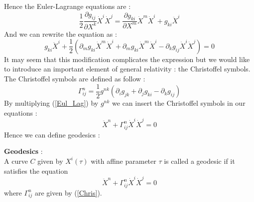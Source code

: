 \documentclass[a4paper,12pt]{article}
\theoremstyle{definition}
\begin{document}
Hence the Euler-Lagrange equations are :
\begin{equation}
	\frac{1}{2}\frac{\partial g_{ij}}{\partial X^k}\dot{X}^i\dot{X}^j=
	\frac{\partial g_{ki}}{\partial X^m}\dot{X}^m\dot{X}^i+g_{ki}\ddot{X}^i
\end{equation}
And we can rewrite the equation as :
\begin{equation}\label{Eul_Lag}
	g_{ki}\ddot{X}^i+\frac{1}{2}(\partial_m g_{ki}\dot{X}^m\dot{X}^i+\partial_m g_{ki}\dot{X}^m\dot{X}^i-\partial_k g_{ij}\dot{X}^i\dot{X}^j)=0
\end{equation}
It may seem that this modification complicates the expression but we would like to introduce an important element of general relativity : the Christoffel symbols.
The Christoffel symbols are defined as follow :
\begin{equation}\label{Chris}
	\Gamma^n_{ij}=\frac{1}{2}g^{nk}(\partial_i g_{jk}+\partial_j g_{ki}-\partial_k g_{ij})
\end{equation}
By multiplying (\ref{Eul_Lag}) by $g^{nk}$ we can insert the Christoffel symbols in our equations :
\begin{equation}
	\ddot{X}^n+\Gamma^n_{ij}\dot{X}^i\dot{X}^j=0
\end{equation}
Hence we can define geodesics :
\begin{definition}
	\textbf{Geodesics} :\\
	A curve $C$ given by $X^i(\tau)$ with affine parameter $\tau$ is called a geodesic if it satisfies the equation
	\begin{equation}\label{Geodesic}
		\ddot{X}^n+\Gamma^n_{ij}\dot{X}^i\dot{X}^j=0
	\end{equation}
	where $\Gamma^n_{ij}$ are given by (\ref{Chris}).
\end{definition}
\end{document}
